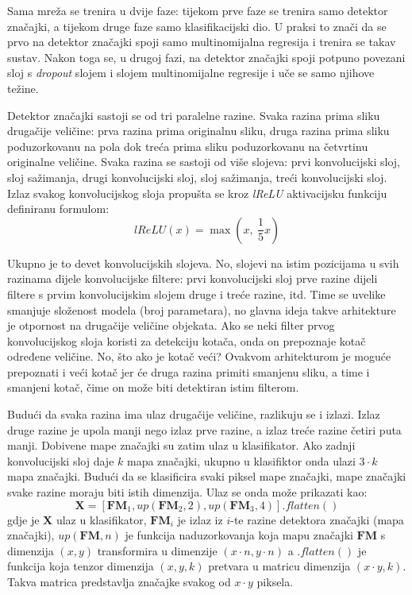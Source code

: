 \documentclass[times, utf8, diplomski, numeric]{fer}
\begin{document}
Sama mreža se trenira u dvije faze: tijekom prve faze se trenira samo detektor značajki, a tijekom druge faze samo klasifikacijski dio. U praksi to znači da se prvo na detektor značajki spoji samo multinomijalna regresija i trenira se takav sustav. Nakon toga se, u drugoj fazi, na detektor značajki spoji potpuno povezani sloj s \emph{dropout} slojem i slojem multinomijalne regresije i uče se samo njihove težine.

Detektor značajki sastoji se od tri paralelne razine. Svaka razina prima sliku drugačije veličine: prva razina prima originalnu sliku, druga razina prima sliku poduzorkovanu na pola dok treća prima sliku poduzorkovanu na četvrtinu originalne veličine. Svaka razina se sastoji od više slojeva: prvi konvolucijski sloj, sloj sažimanja, drugi konvolucijski sloj, sloj sažimanja, treći konvolucijski sloj. Izlaz svakog konvolucijskog sloja propušta se kroz \textit{lReLU} aktivacijsku funkciju definiranu formulom:
\begin{equation}
  lReLU( x ) = \max(x,\ \frac{1}{5} x)
\end{equation}

Ukupno je to devet konvolucijskih slojeva. No, slojevi na istim pozicijama u svih razinama dijele konvolucijske filtere: prvi konvolucijski sloj prve razine dijeli filtere s prvim konvolucijskim slojem druge i treće razine, itd. Time se uvelike smanjuje složenost modela (broj parametara), no glavna ideja takve arhitekture je otpornost na drugačije veličine objekata. Ako se neki filter prvog konvolucijskog sloja koristi za detekciju kotača, onda on prepoznaje kotač određene veličine. No, što ako je kotač veći? Ovakvom arhitekturom je moguće prepoznati i veći kotač jer će druga razina primiti smanjenu sliku, a time i smanjeni kotač, čime on može biti detektiran istim filterom.

Budući da svaka razina ima ulaz drugačije veličine, razlikuju se i izlazi. Izlaz druge razine je upola manji nego izlaz prve razine, a izlaz treće razine četiri puta manji. Dobivene mape značajki su zatim ulaz u klasifikator. Ako zadnji konvolucijski sloj daje $k$ mapa značajki, ukupno u klasifiktor onda ulazi $3 \cdot k$ mapa značajki. Budući da se klasificira svaki piksel mape značajki, mape značajki svake razine moraju biti istih dimenzija. Ulaz se onda može prikazati kao:
\begin{equation}
	\boldsymbol{X} = [\boldsymbol{FM}_1, up(\boldsymbol{FM}_2, 2), up(\boldsymbol{FM}_3, 4)].flatten()
\end{equation}
gdje je $\boldsymbol{X}$ ulaz u klasifikator, $\boldsymbol{FM}_i$ je izlaz iz $i$-te razine detektora značajki (mapa značajki), $up(\boldsymbol{FM}, n)$ je funkcija naduzorkovanja koja mapu značajki $\boldsymbol{FM}$ s dimenzija $(x, y)$ transformira u dimenzije $(x \cdot n, y\cdot n)$ a $.flatten()$ je funkcija koja tenzor dimenzija $(x, y, k)$ pretvara u matricu dimenzija $(x \cdot y, k)$. Takva matrica predstavlja značajke svakog od $x \cdot y$ piksela.
\end{document}
